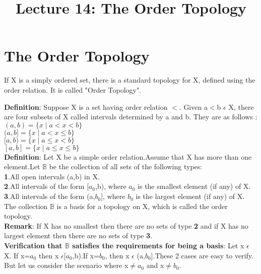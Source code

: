 \documentclass[a4paper,english,12pt]{article}
\title{\bf Lecture 14: The Order Topology}
\author{}
\begin{document}
\maketitle
\section{The Order Topology}
If X is a simply ordered set, there is a standard topology for X, defined using the order relation. It is called "Order Topology".\\
\begin{flushleft}
{\bf Definition}: Suppose X is a set having order relation $<$. Given a$<$b $\epsilon$ X, there are four subsets of X called intervals determined by a and b. They are as follows :\\
$(a,b)=\{x\mid a<x<b\}$\\
$(a,b]=\{x\mid a<x\leq b\}$\\
$[a,b)=\{x\mid a\leq x<b\}$\\
$[a,b]=\{x\mid a\leq x\leq b\}$\\
\vspace{2mm}
{\bf Definition}: Let X be a simple order relation.Assume that X has more than one element.Let $\mathbb{B}$ be the collection of all sets of the following types:\\
\vspace{2mm}
{\bf 1}.All open intervals (a,b) in X.\\
{\bf 2}.All intervals of the form [$a_0$,b), where $a_0$ is the smallest element (if any) of X.\\
{\bf 3}.All intervals of the form (a,$b_0$], where $b_0$ is the largest element (if any) of X.\\
\vspace{2mm}
The collection $\mathbb{B}$ is a basis for a topology on X, which is called the order topology.\\
\vspace{1mm}
{\bf Remark}: If X has no smallest then there are no sets of type {\bf 2} and if X has no largest element then there are no sets of type {\bf 3}.\\
\vspace{1mm}
{\bf Verification that $\mathbb{B}$ satisfies the requirements for being a basis}: Let x $\epsilon$ X. If x=$a_0$ then x $\epsilon$[$a_0$,b).If x=$b_0$, then x $\epsilon$ (a,$b_0$].These 2 cases are easy to verify. But let us consider the scenario where x$\neq a_0$ and x$\neq b_0$.\\

\end{flushleft}
\end{document}
